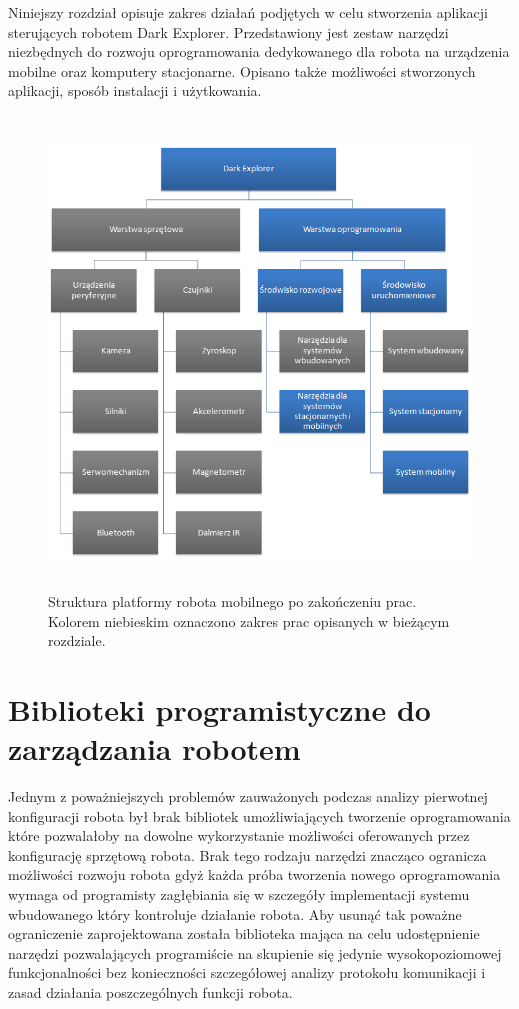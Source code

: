 Niniejszy rozdział opisuje zakres działań podjętych w celu stworzenia aplikacji
sterujących robotem Dark Explorer. Przedstawiony jest zestaw narzędzi niezbędnych
do rozwoju oprogramowania dedykowanego dla robota na urządzenia mobilne oraz
komputery stacjonarne. Opisano także możliwości stworzonych aplikacji, sposób
instalacji i użytkowania.

\begin{figure}[!ht]
 \centering
 \includegraphics[height=125mm]{../images/ch03/dark_explorer_platform_ide_stac_mob.png}
 \caption{Struktura platformy robota mobilnego po zakończeniu prac. Kolorem
 niebieskim oznaczono zakres prac opisanych w bieżącym rozdziale.}
 \label{fig:DarkExplorerPlatformStacMob}
\end{figure}

\section{Biblioteki programistyczne do zarządzania robotem}
Jednym z poważniejszych problemów zauważonych podczas analizy pierwotnej
konfiguracji robota był brak bibliotek umożliwiających tworzenie oprogramowania
które pozwalałoby na dowolne wykorzystanie możliwości oferowanych przez
konfigurację sprzętową robota. Brak tego rodzaju narzędzi znacząco ogranicza
możliwości rozwoju robota gdyż każda próba tworzenia nowego oprogramowania wymaga
od programisty zagłębiania się w szczegóły implementacji systemu wbudowanego
który kontroluje działanie robota. Aby usunąć tak poważne ograniczenie
zaprojektowana została biblioteka mająca na celu udostępnienie narzędzi
pozwalających programiście na skupienie się jedynie wysokopoziomowej
funkcjonalności bez konieczności szczegółowej analizy protokołu komunikacji i
zasad działania poszczególnych funkcji robota.

